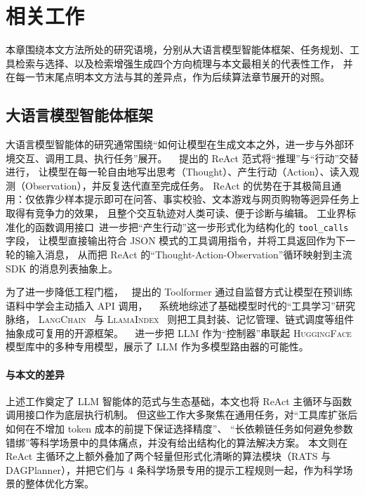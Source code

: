 \clearpage

\section{相关工作}

本章围绕本文方法所处的研究语境，分别从大语言模型智能体框架、任务规划、工具检索与选择、以及检索增强生成四个方向梳理与本文最相关的代表性工作，
并在每一节末尾点明本文方法与其的差异点，作为后续算法章节展开的对照。

\subsection{大语言模型智能体框架}

大语言模型智能体的研究通常围绕“如何让模型在生成文本之外，进一步与外部环境交互、调用工具、执行任务”展开。
\citeauthor{yao2023react}~\cite{yao2023react} 提出的 ReAct 范式将“推理”与“行动”交替进行，
让模型在每一轮自由地写出思考（Thought）、产生行动（Action）、读入观测（Observation），并反复迭代直至完成任务。
ReAct 的优势在于其极简且通用：仅依靠少样本提示即可在问答、事实校验、文本游戏与网页购物等迥异任务上取得有竞争力的效果，
且整个交互轨迹对人类可读、便于诊断与编辑。
工业界标准化的函数调用接口~\cite{openai2023functioncalling}进一步把“产生行动”这一步形式化为结构化的 \texttt{tool\_calls} 字段，
让模型直接输出符合 \textsc{JSON} 模式的工具调用指令，并将工具返回作为下一轮的输入消息，
从而把 ReAct 的“Thought-Action-Observation”循环映射到主流 SDK 的消息列表抽象上。

为了进一步降低工程门槛，\citeauthor{schick2023toolformer}~\cite{schick2023toolformer} 提出的 Toolformer 通过自监督方式让模型在预训练语料中学会主动插入 API 调用，
\citeauthor{qin2023toollearning}~\cite{qin2023toollearning} 系统地综述了基础模型时代的“工具学习”研究脉络，
\textsc{LangChain}~\cite{langchain2023} 与 \textsc{LlamaIndex}~\cite{llamaindex2023} 则把工具封装、记忆管理、链式调度等组件抽象成可复用的开源框架。
\citeauthor{shen2023hugginggpt}~\cite{shen2023hugginggpt} 进一步把 LLM 作为“控制器”串联起 \textsc{HuggingFace} 模型库中的多种专用模型，展示了 LLM 作为多模型路由器的可能性。

\paragraph{与本文的差异}
上述工作奠定了 LLM 智能体的范式与生态基础，本文也将 ReAct 主循环与函数调用接口作为底层执行机制。
但这些工作大多聚焦在通用任务，对“工具库扩张后如何在不增加 token 成本的前提下保证选择精度”、
“长依赖链任务如何避免参数错绑”等科学场景中的具体痛点，并没有给出结构化的算法解决方案。
本文则在 ReAct 主循环之上额外叠加了两个轻量但形式化清晰的算法模块（RATS 与 DAGPlanner），并把它们与 4 条科学场景专用的提示工程规则一起，作为科学场景的整体优化方案。

